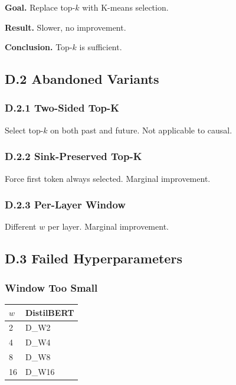 \textbf{Goal.} Replace top-$k$ with K-means selection.

\textbf{Result.} Slower, no improvement.

\textbf{Conclusion.} Top-$k$ is sufficient.

\subsection{D.2 Abandoned Variants}

\subsubsection{D.2.1 Two-Sided Top-K}

Select top-$k$ on both past and future. Not applicable to causal.

\subsubsection{D.2.2 Sink-Preserved Top-K}

Force first token always selected. Marginal improvement.

\subsubsection{D.2.3 Per-Layer Window}

Different $w$ per layer. Marginal improvement.

\subsection{D.3 Failed Hyperparameters}

\subsubsection{Window Too Small}

\begin{table}[H]
\centering
\small
\begin{tabular}{ll}
\toprule
\textbf{$w$} & \textbf{DistilBERT} \\
\midrule
2 & {{D\_W2}} \\
4 & {{D\_W4}} \\
8 & {{D\_W8}} \\
16 & {{D\_W16}} \\
\bottomrule
\end{tabular}
\end{table}

